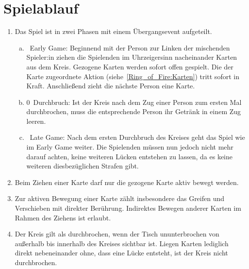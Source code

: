\section{Spielablauf}
\begin{enumerate}[label={(\arabic*)}]
	\item
	Das Spiel ist in zwei Phasen mit einem Übergangsevent aufgeteilt.
	\begin{enumerate}[a.]
		\item
~\glqq{}Early Game\grqq{}:
		Beginnend mit der Person zur Linken der mischenden Spieler:in ziehen die Spielenden im Uhrzeigersinn nacheinander Karten aus dem Kreis.
		Gezogene Karten werden sofort offen gespielt.
		Die der Karte zugeordnete Aktion (siehe~\ref{Ring_of_Fire:Karten}) tritt sofort in Kraft.
		Anschließend zieht die nächste Person eine Karte.
		\item
0~\glqq{}Durchbruch\grqq{}:
		Ist der Kreis nach dem Zug einer Person zum ersten Mal durchbrochen, muss die entsprechende Person ihr Getränk in einem Zug leeren.
		\item
~\glqq{}Late Game\grqq{}:
		Nach dem ersten Durchbruch des Kreises geht das Spiel wie im Early Game weiter.
		Die Spielenden müssen nun jedoch nicht mehr darauf achten, keine weiteren Lücken entstehen zu lassen, da es keine weiteren diesbezüglichen Strafen gibt.
	\end{enumerate}

	\item
	Beim Ziehen einer Karte darf nur die gezogene Karte aktiv bewegt werden.

	\item
	Zur aktiven Bewegung einer Karte zählt insbesondere das Greifen und Verschieben mit direkter Berührung.
	Indirektes Bewegen anderer Karten im Rahmen des Ziehens ist erlaubt.

	\item
	Der Kreis gilt als durchbrochen, wenn der Tisch ununterbrochen von außerhalb bis innerhalb des Kreises sichtbar ist.
	Liegen Karten lediglich direkt nebeneinander ohne, dass eine Lücke entsteht, ist der Kreis nicht durchbrochen.
\end{enumerate}

